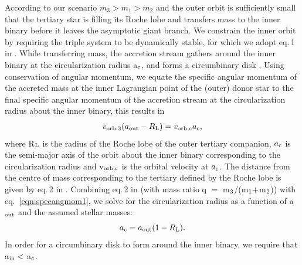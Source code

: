 \documentclass{aastex62}
\begin{document}
According to our scenario $m_3 > m_1 > m_2$ and the outer orbit is
sufficiently small that the tertiary star is filling its Roche lobe
and transfers mass to the inner binary before it leaves the asymptotic
giant branch. We constrain the inner orbit by requiring the triple
system to be dynamically stable, for which we adopt eq.\,1 in
\cite{1999ASIC..522..385M,}.  While transferring mass, the accretion
stream gathers around the inner binary at the circularization radius
a$_{\rm c}$, and forms a circumbinary disk
\citep{2002apa..book.....F}.  Using conservation of angular momentum,
we equate the specific angular momentum of the accreted mass at the
inner Lagrangian point of the (outer) donor star to the final specific
angular momentum of the accretion stream at the circularization radius
about the inner binary, this results in
\begin{equation}
\label{eqn:specangmom1}
v_{\rm orb,3}(a_{\rm out} - R_{\rm L}) = v_{\rm orb,c}a_{\rm c},
\end{equation}
where R$_{\rm L}$ is the radius of the Roche lobe of the outer
tertiary companion, $a_{\rm c}$ is the semi-major axis of the orbit
about the inner binary corresponding to the circularization radius and
v$_{\rm orb,c}$ is the orbital velocity at $a_{\rm c}$.  The distance
from the centre of mass corresponding to the tertiary defined by the
Roche lobe is given by eq.\,2 in \citep{1983ApJ...268..368E}.
Combining eq.\,2 in \citet{1983ApJ...268..368E} (with mass ratio q
$=$ m$_{\rm 3}$/(m$_{\rm 1} +$m$_{\rm 2}$)) with
eq.~\ref{eqn:specangmom1}, we solve for the circularization
radius as a function of a$_{\rm out}$ and the assumed stellar masses:
\begin{equation}
\label{eqn:ac}
a_{\rm c} = a_{\rm out}(1 - R_{\rm L}).
\end{equation}
In order for a circumbinary disk to form around the inner binary, we
require that a$_{\rm in} <$ a$_{\rm c}$.
\end{document}

